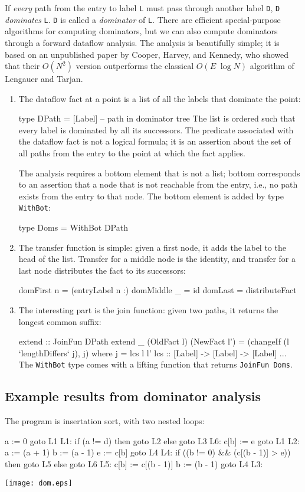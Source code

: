 \documentclass[twocolumn]{article}
\newenvironment{code}{\par\unskip\kern-6pt \small\verbatim}{\endverbatim}
\newenvironment{smallcode}{\par\unskip\footnotesize\verbatim}{\endverbatim}
\begin{document}
If \emph{every} path from the entry to
label \texttt{L} must pass through another label \texttt{D},
\texttt{D} \emph{dominates} \texttt{L}.
\texttt{D} is called a \emph{dominator} of \texttt{L}.
There are efficient special-purpose
algorithms for computing dominators, but we can also compute
dominators through a forward dataflow analysis.
The analysis is beautifully simple; it is based on an unpublished
paper by Cooper, Harvey, and Kennedy, who showed that their $O(N^2)$ version
outperforms the classical $O(E\;\log N)$ algorithm of Lengauer and
Tarjan.
\begin{enumerate}
\item
The dataflow fact at a point is a list of all the labels that dominate
the point:
\begin{code}
type DPath = [Label] -- path in dominator tree
\end{code}
The list is ordered such that every label is dominated by all its
successors.
The predicate associated with the dataflow fact is not a logical
formula; it is an assertion about the set of all paths from the entry to
the point at which the fact applies.

The analysis requires a bottom element that is not a list;
bottom corresponds to an assertion that a node that is not reachable
from the entry, i.e., no path exists from the entry to that node.
The bottom element is added by type \texttt{WithBot}:
\begin{code}
type Doms = WithBot DPath
\end{code}
\item
The transfer function is simple: given a first node, it adds the label
to the head of the list.
Transfer for a middle node is the identity, and
transfer for a last node distributes the fact to its successors:
\begin{code}
domFirst n  = (entryLabel n :)
domMiddle _ = id
domLast     = distributeFact
\end{code}
\item
The interesting part is the join function:
given two paths, it returns the longest common suffix:
\begin{code}
extend :: JoinFun DPath
extend _ (OldFact l) (NewFact l')
  = (changeIf (l `lengthDiffers` j), j)
 where j = lcs l l'
       lcs :: [Label] -> [Label] -> [Label]
       ...
\end{code}
The \texttt{WithBot} type comes with a lifting function that returns
\texttt{JoinFun~Doms}.
\end{enumerate}

\subsection{Example results from dominator analysis}

The program is insertation sort, with two nested loops:
\begin{smallcode}
  a := 0
  goto L1
L1:
  if (a != d) then goto L2 else goto L3
L6:
  c[b] := e
  goto L1
L2:
  a := (a + 1)
  b := (a - 1)
  e := c[b]
  goto L4
L4:
  if ((b != 0) && (c[(b - 1)] > e)) then goto L5 else goto L6
L5:
  c[b] := c[(b - 1)]
  b := (b - 1)
  goto L4
L3:
\end{smallcode}

\centerline{%
\texttt{[image: dom.eps]}%
}
\end{document}
